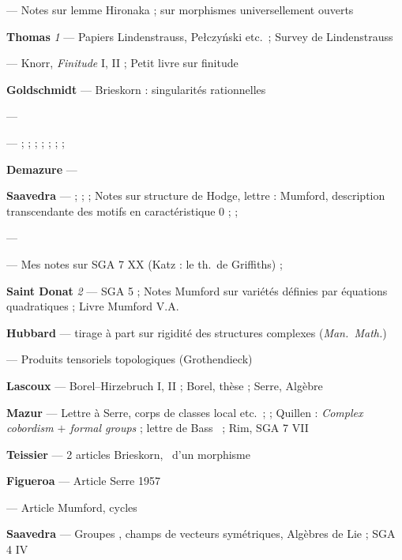 \documentclass[11pt,a4paper]{article}
\begin{document}
\textbf{} — Notes sur lemme Hironaka ; 
sur morphismes universellement ouverts

\textbf{Thomas} \emph{1} — Papiers Lindenstrauss, Pełczyński etc.\ ; Survey de
Lindenstrauss \ill

\textbf{} — Knorr, \emph{Finitude} I, II ; Petit livre sur
finitude

\textbf{Goldschmidt} — Brieskorn : singularités rationnelles \ill

\textbf{\struck{\ill}} — 


\textbf{\struck{\ill}} —  ;  ;
 ;  ;  ;  ;  ; 

\textbf{Demazure} — 

\textbf{Saavedra} —  ;  ;  ;
Notes sur structure de Hodge, lettre : Mumford, description transcendante des
motifs en caractéristique 0 ;  ;

\textbf{} — \ill

\textbf{} — Mes notes sur SGA 7 XX (Katz : le th.\ de
Griffiths) ; 

\textbf{Saint Donat} \emph{2} — SGA 5  ; Notes Mumford sur
variétés définies par équations quadratiques ; Livre Mumford V.A.

\textbf{Hubbard} — tirage à part sur rigidité des structures complexes
(\emph{Man.\ Math.})

\textbf{} — Produits tensoriels topologiques (Grothendieck)


\textbf{Lascoux} — Borel--Hirzebruch I, II ; Borel, thèse ; Serre, Algèbre

\textbf{Mazur} — Lettre à Serre, corps de classes local etc.\ ;  ; Quillen : \emph{Complex cobordism $+$ formal
groups} ; lettre de Bass \ill\ ; Rim, SGA 7 VII

\textbf{Teissier} — 2 articles Brieskorn, \ill\ d'un morphisme

\textbf{Figueroa} — Article Serre 1957

\textbf{} — Article Mumford, cycles

\textbf{Saavedra} — Groupes \ill, champs de vecteurs symétriques, 
Algèbres de Lie  ; SGA 4 IV
\end{document}
